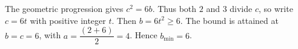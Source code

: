 The geometric progression gives $c^2=6b$. Thus both $2$ and $3$ divide $c$, so write $c=6t$ with positive integer $t$. Then $b=6t^2\ge6$. The bound is attained at $b=c=6$, with $a=\dfrac{(2+6)}{2}=4$. Hence $\boxed{b_{\min}=6}$.
